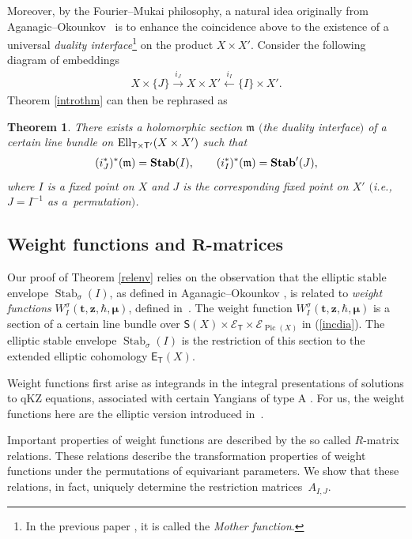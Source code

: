 \documentclass[10pt,a4paper]{amsart}
\DeclareMathOperator\Stab{Stab}
\newcommand{\bT}{\mathsf{T}}
\newcommand{\sE}{\mathscr{E}}
\DeclareMathOperator\Pic{Pic}
\def\ttt{{\boldsymbol t}}
\def\zz{{\boldsymbol z}}
\def\mub{{\boldsymbol\mu}}
\numberwithin{equation}{section}
\newtheorem{Theorem}{Theorem}[section]
\begin{document}
Moreover, by the Fourier--Mukai philosophy, a natural idea originally from Aganagic--Okoun\-kov~\cite{AOelliptic} is to enhance the coincidence above to the existence of a universal \emph{duality interface}\footnote{In the previous paper \cite{RVSZ}, it is called the \emph{Mother function}. } on the product $X \times X'$. Consider the following diagram of embeddings
\begin{gather*}
X\times \{ J \} \stackrel{i_{J}}{\longrightarrow} X\times X' \stackrel{i_{I}}{\longleftarrow} \{I\}\times X'.
\end{gather*}
Theorem \ref{introthm} can then be rephrased as
\begin{Theorem}
 There exists a holomorphic section ${\mathfrak{m}}$ $($the duality interface$)$ of a certain line bundle on ${\rm Ell}_{\bT\times\bT'}(X\times X')$ such that
 \begin{gather*}
 (i^{*}_{J})^*({\mathfrak{m}})= {\bf Stab}(I), \qquad (i^{*}_{I})^*({\mathfrak{m}})= {\bf Stab}' (J),
 \end{gather*}
 where $I$ is a fixed point on $X$ and $J$ is the corresponding fixed point on $X'$ $($i.e., $J=I^{-1}$ as a~permutation$)$.
\end{Theorem}

\subsection[Weight functions and $R$-matrices]{Weight functions and $\boldsymbol{R}$-matrices}

Our proof of Theorem \ref{relenv} relies on the observation that the elliptic stable envelope $\Stab_\sigma (I)$, as defined in Aganagic--Okounkov \cite{AOelliptic}, is related to \emph{weight functions} $W^{\sigma}_I (\ttt, \zz, \hbar, \mub)$, defined in~\cite{RTV}. The weight function $W^{\sigma}_I (\ttt, \zz, \hbar, \mub)$ is a section of a certain line bundle over $\mathsf{S}(X) \times \sE_\bT \times \sE_{\Pic(X)}$ in (\ref{incdia}). The elliptic stable envelope $\Stab_\sigma (I)$ is the restriction of this section to
the extended elliptic cohomology $\textsf{E}_\bT(X)$.

Weight functions first arise as integrands in the integral presentations of solutions to qKZ equations, associated with certain Yangians of type A \cite{FTV, FTV2,TV4, TV5, TV6, TV7, Var}. For us, the weight functions here are the elliptic version introduced in~\cite{RTV}.

Important properties of weight functions are described by the so called $R$-matrix relations. These relations describe the transformation properties of weight functions under the permutations of equivariant parameters. We show that these relations, in fact, uniquely determine the restriction matrices~$A_{I,J}$.
\end{document}
